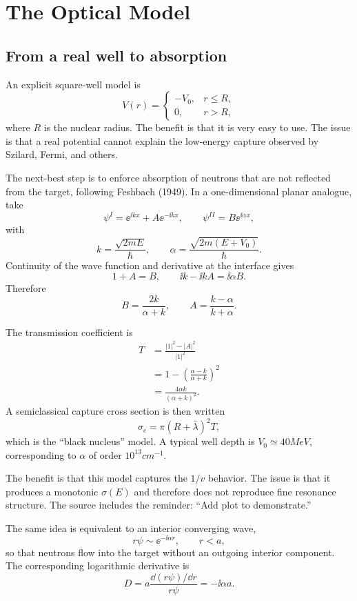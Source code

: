 \chapter{The Optical Model}

\section{From a real well to absorption}
An explicit square-well model is
\[
  V(r)=
  \begin{cases}
    -V_0, & r\le R,\\
    0, & r>R,
  \end{cases}
\]
where $R$ is the nuclear radius.  The benefit is that it is very easy to use.  The issue is that a real potential cannot explain the low-energy capture observed by Szilard, Fermi, and others.

The next-best step is to enforce absorption of neutrons that are not reflected from the target, following Feshbach (1949).  In a one-dimensional planar analogue, take
\[
  \psi^{I}=\ee^{\ii kx}+A\ee^{-\ii kx},
  \qquad
  \psi^{II}=B\ee^{\ii\alpha x},
\]
with
\[
  k=\frac{\sqrt{2mE}}{\hbar},
  \qquad
  \alpha=\frac{\sqrt{2m(E+V_0)}}{\hbar}.
\]
Continuity of the wave function and derivative at the interface gives
\[
  1+A=B,
  \qquad
  \ii k-\ii kA=\ii\alpha B.
\]
Therefore
\[
  B=\frac{2k}{\alpha+k},
  \qquad
  A=\frac{k-\alpha}{k+\alpha}.
\]

The transmission coefficient is
\begin{align*}
  T
  &=\frac{|1|^2-|A|^2}{|1|^2}\\
  &=1-\left(\frac{\alpha-k}{\alpha+k}\right)^2\\
  &=\frac{4\alpha k}{(\alpha+k)^2}.
\end{align*}
A semiclassical capture cross section is then written
\[
  \sigma_c=\pi(R+\bar\lambda)^2T,
\]
which is the ``black nucleus'' model.  A typical well depth is $V_0\simeq40\unit{MeV}$, corresponding to $\alpha$ of order $10^{13}\unit{cm^{-1}}$.

The benefit is that this model captures the $1/v$ behavior.  The issue is that it produces a monotonic $\sigma(E)$ and therefore does not reproduce fine resonance structure.  The source includes the reminder: ``Add plot to demonstrate.''

The same idea is equivalent to an interior converging wave,
\[
  r\psi\sim\ee^{-\ii\alpha r},
  \qquad r<a,
\]
so that neutrons flow into the target without an outgoing interior component.  The corresponding logarithmic derivative is
\[
  D=a\frac{\dd(r\psi)/\dd r}{r\psi}=-\ii\alpha a.
\]

